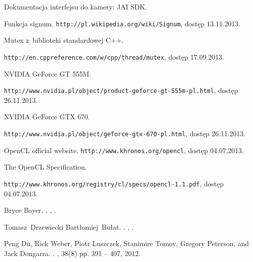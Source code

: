\documentclass[pdflatex,11pt]{aghdpl}
\author{Tomasz Drzewiecki}
\date{2014}
\begin{document}
\titlepages

\tableofcontents
\clearpage










%
%
%
%


%

\begin{thebibliography}{10}

{Dokumentacja interfejsu do kamery: JAI SDK}.

Funkcja signum.
\newblock \texttt{http://pl.wikipedia.org/wiki/Signum}, dostęp 13.11.2013.

{Mutex z~biblioteki standardowej C++}.

\newblock \texttt{http://en.cppreference.com/w/cpp/thread/mutex}, dostęp 17.09.2013.

{NVIDIA GeForce GT 555M}.

\newblock \texttt{http://www.nvidia.pl/object/product-geforce-gt-555m-pl.html}, dostęp 26.11.2013.

{NVIDIA GeForce GTX 670}.

\newblock \texttt{http://www.nvidia.pl/object/geforce-gtx-670-pl.html}, dostęp 26.11.2013.

{OpenCL official website}.
\newblock \texttt{http://www.khronos.org/opencl}, dostęp 04.07.2013.

{The OpenCL Specification}.

\newblock \texttt{http://www.khronos.org/registry/cl/specs/opencl-1.1.pdf}, dostęp 04.07.2013.

Bryce Bayer.
.
,
.

Tomasz~Drzewiecki Bartłomiej~Bułat.
.
,
.

Peng Du, Rick Weber, Piotr Luszczek, Stanimire Tomov, Gregory Peterson, and
  Jack Dongarra.
.
, 38(8) pp. 391 -- 407, 2012.


\end{thebibliography}
\end{document}
